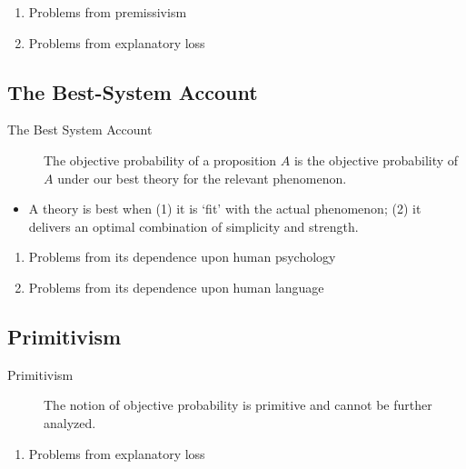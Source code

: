 \documentclass[12pt]{article}
\theoremstyle{definition}
\begin{document}
\begin{enumerate}
\item Problems from premissivism
\item Problems from explanatory loss
\end{enumerate}

\subsection{The Best-System Account}

\begin{description}
\item[The Best System Account] The objective probability of a proposition $A$ is the objective probability of $A$ under our best theory for the relevant phenomenon.
\end{description}

\begin{itemize}
\item A theory is best when (1) it is `fit' with the actual phenomenon; (2) it delivers an optimal combination of simplicity and strength.
\end{itemize}

\begin{enumerate}
\item Problems from its dependence upon human psychology
\item Problems from its dependence upon human language
\end{enumerate}


\subsection{Primitivism}
\begin{description}
\item[Primitivism] The notion of objective probability is primitive and cannot be further analyzed.
\end{description}

\begin{enumerate}
\item Problems from explanatory loss
\end{enumerate}
\end{document}
